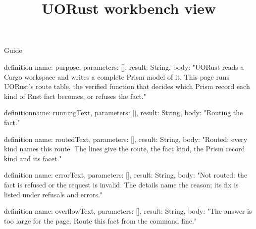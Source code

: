 \begin{lexlean}{Guide}
\title{UORust workbench view}
\begin{semanticmodule}
definition{
  name: purpose,
  parameters: [],
  result: String,
  body: "UORust reads a Cargo workspace and writes a complete Prism model of it. This page runs UORust's route table, the verified function that decides which Prism record each kind of Rust fact becomes, or refuses the fact."
}

definition{name: runningText, parameters: [], result: String, body: "Routing the fact."}

definition{
  name: routedText,
  parameters: [],
  result: String,
  body: "Routed: every kind names this route. The lines give the route, the fact kind, the Prism record kind and its facet."
}

definition{
  name: errorText,
  parameters: [],
  result: String,
  body: "Not routed: the fact is refused or the request is invalid. The details name the reason; its fix is listed under refusals and errors."
}

definition{
  name: overflowText,
  parameters: [],
  result: String,
  body: "The answer is too large for the page. Route this fact from the command line."
}


\end{semanticmodule}
\end{lexlean}
